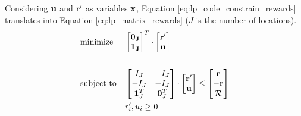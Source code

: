 \begin{appendices}
    Considering $\mathbf{u}$ and $\mathbf{r'}$ as variables $\mathbf{x}$, Equation \ref{eq:lp_code_constrain_rewards} translates into Equation \ref{eq:lp_matrix_rewards} ($J$ is the number of locations).
    \begin{equation} \label{eq:lp_matrix_rewards}
    \begin{aligned}
    & \text{minimize}
    & & \begin{bmatrix}
    \mathbf{0_J}\\
    \mathbf{1_J}\\
    \end{bmatrix}^T \cdot
    \begin{bmatrix}
    \mathbf{r'}\\
    \mathbf{u}
    \end{bmatrix}\\ \\
    & \text{subject to}
    & & \begin{bmatrix}
    I_J & -I_J\\
    -I_J & -I_J\\
    \mathbf{1}^T_J & \mathbf{0}^T_J\\
    \end{bmatrix} \cdot
    \begin{bmatrix}
    \mathbf{r'}\\
    \mathbf{u}\\
    \end{bmatrix} \leq
    \begin{bmatrix}
    \mathbf{r}\\
    -\mathbf{r}\\
    \mathcal{R}\\
    \end{bmatrix}\\
    &&& r'_i, u_i \geq 0
    \end{aligned}
    \end{equation}
\end{appendices}
